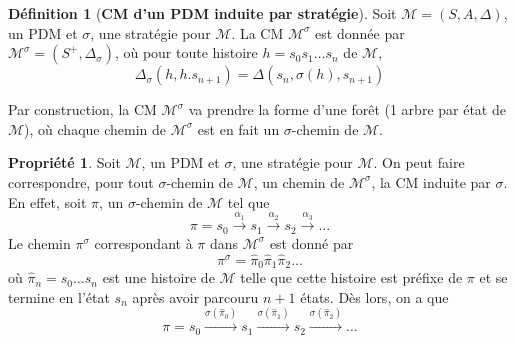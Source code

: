 \documentclass[12pt,a4paper]{report}
\theoremstyle{definition}%
\newtheorem{definition}{Définition}[chapter]
\newtheorem{propriete}{Propriété}[chapter]
\theoremstyle{remark}
\begin{document}
\begin{definition}[\textbf{CM d'un PDM induite par stratégie}]
Soit $\mathcal{M} = (S, A, \Delta)$, un PDM et $\sigma$, une stratégie pour
$\mathcal{M}$. La CM $\mathcal{M}^\sigma$ est donnée par
$ \mathcal{M}^\sigma = (S^+, \Delta_\sigma) $, où pour toute histoire
$h = s_0 s_1 \dots s_n$ de $\mathcal{M}$,
\[\Delta_\sigma(h, h . s_{n+1}) = \Delta(s_n, \sigma(h), s_{n+1}) \]
\end{definition}

Par construction, la CM $\mathcal{M}^{\sigma}$ va prendre la forme d'une forêt (1
arbre par état de $\mathcal{M}$), où chaque chemin de $\mathcal{M}^{\sigma}$
est en fait un $\sigma$-chemin de $\mathcal{M}$. \\

\begin{propriete}
	Soit $\mathcal{M}$, un PDM et $\sigma$, une stratégie pour $\mathcal{M}$.
	On peut faire correspondre, pour tout $\sigma$-chemin de $\mathcal{M}$,
	un chemin de $\mathcal{M}^\sigma$, la CM induite par $\sigma$.
	En effet, soit $\pi$, un $\sigma$-chemin de $\mathcal{M}$ tel que
	\[
		\pi = s_0 \xrightarrow{\alpha_1} s_1 \xrightarrow{\alpha_2} s_2 \xrightarrow{\alpha_3} \dots
\]
Le chemin $\pi^\sigma$ correspondant à $\pi$ dans $\mathcal{M}^\sigma$
est donné par
\[
	\pi^\sigma = \hat{\pi}_0\hat{\pi}_1\hat{\pi}_2\dots
\]
où $\hat{\pi}_n = s_0 \dots s_n$ est une histoire de $\mathcal{M}$ telle que cette
histoire est préfixe de $\pi$ et se termine en l'état $s_n$ après avoir parcouru
$n+1$ états.
Dès lors, on a que
\[
	\pi = s_0 \xrightarrow{\sigma(\hat{\pi}_0)} s_1 \xrightarrow{\sigma(\hat{\pi}_1)} s_2 \xrightarrow{\sigma(\hat{\pi}_2)} \dots
\]
\end{propriete}
\end{document}
